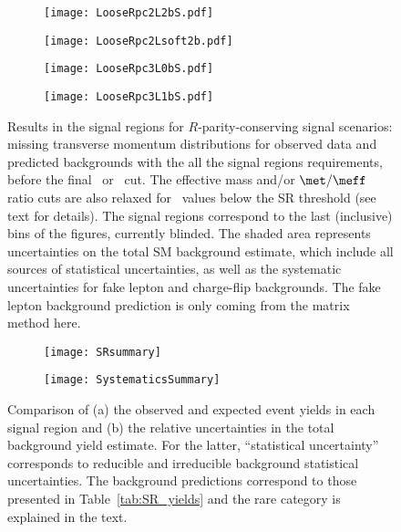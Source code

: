 \begin{figure}[p!]
\centering
   \begin{subfigure}{0.42\textwidth}
 \texttt{[image: LooseRpc2L2bS.pdf]}
 \end{subfigure}
   \begin{subfigure}{0.42\textwidth}
 \texttt{[image: LooseRpc2Lsoft2b.pdf]}
 \end{subfigure}
   \begin{subfigure}{0.42\textwidth}
 \texttt{[image: LooseRpc3L0bS.pdf]}
 \end{subfigure}
    \begin{subfigure}{0.42\textwidth}
 \texttt{[image: LooseRpc3L1bS.pdf]}
 \end{subfigure}
   \caption{
Results in the signal regions for $R$-parity-conserving signal scenarios: 
missing transverse momentum distributions for observed data and predicted backgrounds 
with the all the signal regions requirements, before the final \met\ or \meff\ cut. 
The effective mass and/or $\met/\meff$ ratio cuts are also relaxed for \met\ values below the SR threshold (see text for details). 
The signal regions correspond to the last (inclusive) bins of the figures, currently blinded. 
The shaded area represents uncertainties on the total SM background estimate, 
which include all sources of statistical uncertainties, 
as well as the systematic uncertainties for fake lepton and charge-flip backgrounds. 
The fake lepton background prediction is only coming from the matrix method here. 
}
\label{fig:results_datamc_rpc}
\end{figure}


\begin{figure}[t]
\begin{center}
\begin{subfigure}[t]{0.98\textwidth}\texttt{[image: SRsummary]}\caption{}\label{fig:Results_SRSum}\end{subfigure}
\begin{subfigure}[t]{1.08\textwidth}\texttt{[image: SystematicsSummary]}\caption{}\label{fig:Results_SystSum}\end{subfigure}
\end{center}
\caption{Comparison of (a) the observed and expected event yields in each signal region and (b) the relative uncertainties in the total 
background yield estimate. For the latter, ``statistical uncertainty'' corresponds to reducible and irreducible background 
statistical uncertainties. The background predictions correspond to those presented in Table~\ref{tab:SR_yields} and the 
rare category is explained in the text. } 
\label{fig:PlotSR}
\end{figure}


